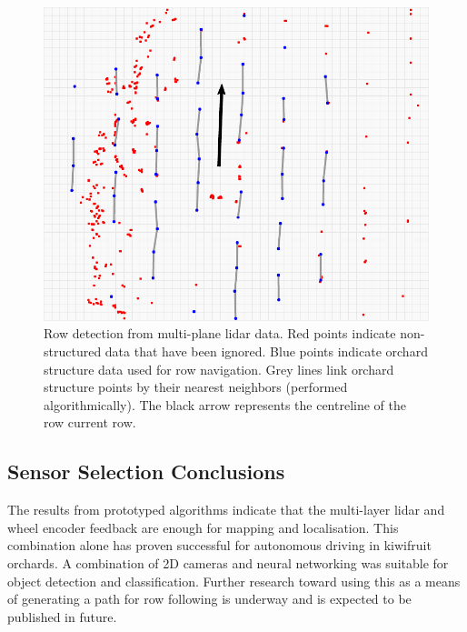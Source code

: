 \documentclass[preprint,authoryear,12pt]{elsarticle}
\begin{document}
        \begin{figure}[htb]
            \centering
            \includegraphics[width=\linewidth]{imgs/row_following/row_following_narrow.pdf}
            \caption{
                Row detection from multi-plane lidar data.
                Red points indicate non-structured data that have been ignored.
                Blue points indicate orchard structure data used for row navigation.
                Grey lines link orchard structure points by their nearest neighbors (performed algorithmically).
                The black arrow represents the centreline of the row current row.
            }
            \label{fig:lastLidarFrame}
        \end{figure}

\subsection{Sensor Selection Conclusions}
    The results from prototyped algorithms indicate that the multi-layer lidar and wheel encoder feedback are enough for mapping and localisation.
    This combination alone has proven successful for autonomous driving in kiwifruit orchards.
    A combination of 2D cameras and neural networking was suitable for object detection and classification.
    Further research toward using this as a means of generating a path for row following is underway and is expected to be published in future.

\end{document}
